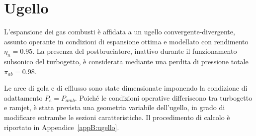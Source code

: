 \section{Ugello}
\label{sec:turboUgello}

L'espansione dei gas combusti è affidata a un ugello convergente-divergente,
assunto operante in condizioni di espansione ottima e modellato con rendimento
$\eta_n=0.95$. La presenza del postbruciatore, inattivo durante il
funzionamento subsonico del turbogetto, è considerata mediante una perdita
di pressione totale $\pi_{ab}=0.98$.

Le aree di gola e di efflusso sono state dimensionate imponendo la condizione
di adattamento $P_e=P_{amb}$. Poiché le condizioni operative differiscono
tra turbogetto e ramjet, è stata prevista una geometria variabile dell'ugello,
in grado di modificare entrambe le sezioni caratteristiche. Il procedimento
di calcolo è riportato in Appendice~\ref{appB:ugello}.








